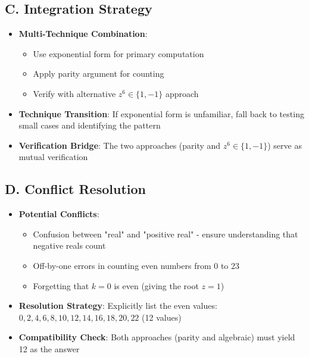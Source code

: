 \documentclass[]{article}
\begin{document}
\begin{techniquesbox}
\subsection*{C. Integration Strategy}
\begin{itemize}[leftmargin=*]
    \item \textbf{Multi-Technique Combination}: 
    \begin{itemize}
        \item Use exponential form for primary computation
        \item Apply parity argument for counting
        \item Verify with alternative $z^6 \in \{1, -1\}$ approach
    \end{itemize}
    \item \textbf{Technique Transition}: If exponential form is unfamiliar, fall back to testing small cases and identifying the pattern
    \item \textbf{Verification Bridge}: The two approaches (parity and $z^6 \in \{1,-1\}$) serve as mutual verification
\end{itemize}

\subsection*{D. Conflict Resolution}
\begin{itemize}[leftmargin=*]
    \item \textbf{Potential Conflicts}: 
    \begin{itemize}
        \item Confusion between "real" and "positive real" - ensure understanding that negative reals count
        \item Off-by-one errors in counting even numbers from 0 to 23
        \item Forgetting that $k=0$ is even (giving the root $z=1$)
    \end{itemize}
    \item \textbf{Resolution Strategy}: Explicitly list the even values: $0, 2, 4, 6, 8, 10, 12, 14, 16, 18, 20, 22$ (12 values)
    \item \textbf{Compatibility Check}: Both approaches (parity and algebraic) must yield 12 as the answer
\end{itemize}
\end{techniquesbox}
\end{document}
